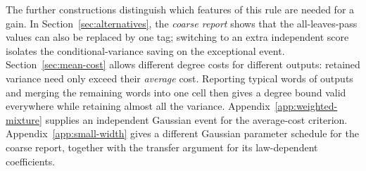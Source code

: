 The further constructions distinguish which features of this rule are
needed for a gain. In Section~\ref{sec:alternatives}, the \emph{coarse
report} shows that the all-leaves-pass values can also be replaced by
one tag; switching to an extra independent score isolates the
conditional-variance saving on the exceptional event.
Section~\ref{sec:mean-cost} allows different degree costs for different
outputs: retained variance need only exceed their \emph{average} cost.
Reporting typical words of outputs and merging the remaining words into
one cell then gives a degree bound valid everywhere while retaining
almost all the variance.
Appendix~\ref{app:weighted-mixture} supplies an independent Gaussian
event for the average-cost criterion. Appendix~\ref{app:small-width}
gives a different Gaussian parameter schedule for the coarse report,
together with the transfer argument for its law-dependent coefficients.
